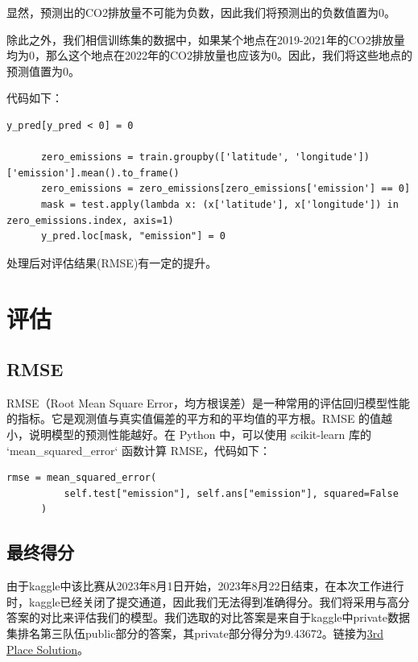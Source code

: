 \documentclass{ctexart}
\begin{document}
显然，预测出的CO2排放量不可能为负数，因此我们将预测出的负数值置为0。

除此之外，我们相信训练集的数据中，如果某个地点在2019-2021年的CO2排放量均为0，那么这个地点在2022年的CO2排放量也应该为0。因此，我们将这些地点的预测值置为0。

代码如下：

\begin{lstlisting}[style=Python]
      y_pred[y_pred < 0] = 0
      
      zero_emissions = train.groupby(['latitude', 'longitude'])['emission'].mean().to_frame()
      zero_emissions = zero_emissions[zero_emissions['emission'] == 0]
      mask = test.apply(lambda x: (x['latitude'], x['longitude']) in zero_emissions.index, axis=1)
      y_pred.loc[mask, "emission"] = 0
\end{lstlisting}

处理后对评估结果(RMSE)有一定的提升。

\section{评估}

\subsection{RMSE}

RMSE（Root Mean Square Error，均方根误差）是一种常用的评估回归模型性能的指标。它是观测值与真实值偏差的平方和的平均值的平方根。RMSE 的值越小，说明模型的预测性能越好。在 Python 中，可以使用 scikit-learn 库的 `mean\_squared\_error` 函数计算 RMSE，代码如下：

\begin{lstlisting}[style=Python]
      rmse = mean_squared_error(
          self.test["emission"], self.ans["emission"], squared=False
      )
\end{lstlisting}

\subsection{最终得分}

由于kaggle中该比赛从2023年8月1日开始，2023年8月22日结束，在本次工作进行时，kaggle已经关闭了提交通道，因此我们无法得到准确得分。我们将采用与高分答案的对比来评估我们的模型。我们选取的对比答案是来自于kaggle中private数据集排名第三队伍public部分的答案，其private部分得分为9.43672。链接为\href{https://www.kaggle.com/competitions/playground-series-s3e20/discussion/433822}{3rd Place Solution}。
\end{document}

